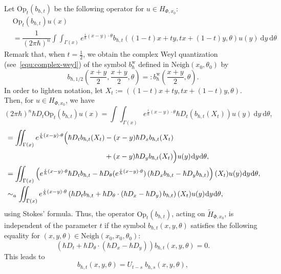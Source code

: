 \documentclass{article}
\newcommand{\Vois}{\mathrm{Neigh}}
\newcommand{\Op}{\mathrm{Op}}
\newcommand{\w}{\mathrm{w}}
\newcommand{\DD}{\:\!\mathrm{d}}
\newcommand{\intint}{\int\!\!\!\!\int}
\newcommand{\h}{\hbar}
\begin{document}
Let $ \Op_t(b_{ \hbar, t})$ be the following operator for
$u \in H_{ \Phi, x_0}$:
\begin{align}
  & \Op_t(b_{ \hbar, t}) u(x) \\
  &= \dfrac{1}{(2 \pi \hbar)^n}
    \intint_{\Gamma(x)} e^{\frac{i}{\h}(x-y)\cdot \theta} b_{ \hbar, t}
    ((1-t)x+ty, tx+(1-t)y, \theta) u(y) \DD y \DD \theta 
\end{align}
Remark that, when $t = \frac{1}{2}$, we obtain the complex Weyl
quantization (see~\eqref{equ:complex-weyl}) of the symbol
$b^{\w}_{\hbar}$ defined in $\Vois(x_0, \theta_0)$ by
\[ b_{ \hbar, 1/2} \left( \frac{x+y}{2}, \frac{x+y}{2}, \theta \right)
=: b^{\w}_{\hbar} \left( \frac{x+y}{2}, \theta\right).
\]
In order to lighten notation, let
$X_t:=((1-t)x+ty, tx+(1-t)y, \theta)$. Then, for
$u \in H_{\Phi, x_0}$, we have
\[
(2 \pi \hbar)^n \hbar D_t \Op_t(b_{ \hbar, t}) u(x) =
\intint_{\Gamma(x)} e^{\frac{i}{\h}(x-y)\cdot \theta} \hbar D_t \left(
  b_{ \hbar, t} (X_t) \right) u(y) \DD y \DD \theta,
\]
\begin{align}
  & = \intint_{\Gamma(x)} e^{\frac{i}{\h}(x-y)\cdot \theta}
    \Big( \hbar D_t b_{ \hbar, t}(X_t) - (x-y) \hbar D_x b_{ \hbar, t}(X_t) \\
  & \hspace{0.4\linewidth}  + (x-y) \hbar D_y b_{ \hbar, t}(X_t) \Big) u(y) \DD y
    \DD \theta ,\\
  & =  \intint_{\Gamma(x)} \left(e^{\frac{i}{\h}(x-y)\cdot \theta} \hbar D_t b_{ \hbar, t} 
    - \hbar D_{ \theta} ( e^{\frac{i}{\h}(x-y)\cdot \theta} ) \left(\hbar D_x b_{ \hbar, t} 
    - \hbar D_y b_{ \hbar, t}\right)\right) (X_t) u(y) \DD y \DD \theta, \\
  & \sim_a  \intint_{\Gamma(x)} e^{\frac{i}{\h}(x-y)\cdot \theta} \left( \hbar D_t b_{ \hbar, t} + \hbar D_{ \theta}\cdot  \left(\hbar D_x - \hbar D_y \right) b_{ \hbar, t} \right)  (X_t) u(y) \DD y \DD \theta,
\end{align}
using Stokes' formula.  Thus, the operator $ \Op_t(b_{ \hbar, t})$,
acting on $\widetilde H_{\Phi,x_0}$, is independent of the parameter
$t$ if the symbol $b_{ \hbar, t}(x, y, \theta)$ satisfies the
following equality for
$(x, y, \theta) \in \Vois \left(x_0, x_0, \theta_0 \right)$:
\[
\left( \hbar D_t + \hbar D_{ \theta}\cdot \left( \hbar D_x - \hbar D_y
  \right) \right) b_{ \hbar, t}(x, y, \theta) = 0 .
\]
This leads to
\begin{equation}
  b_{ \hbar, t}(x, y, \theta) = U_{t-s} \; b_{ \hbar, s}(x, y, \theta) ,
\end{equation}
\end{document}
